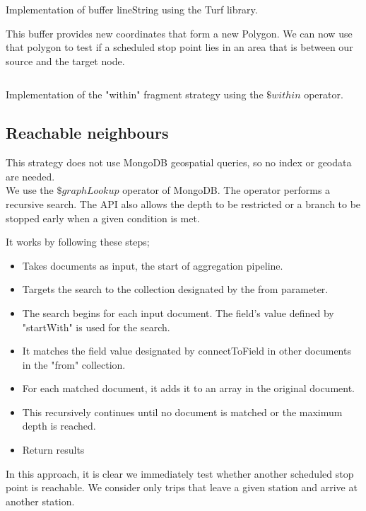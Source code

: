 \begin{listing}[H]
    \inputminted[linenos,frame=single,breaklines]{TypeScript}{code/turf.ts}
    \caption{Implementation of buffer lineString using the Turf library.}
\end{listing}

This buffer provides new coordinates that form a new Polygon. We can now use that polygon to test if a scheduled stop point lies in an area that is between our source and the target node.

\begin{listing}[H]
    \inputminted[linenos,frame=single,breaklines]{TypeScript}{code/within.ts}
    \caption{Implementation of the "within" fragment strategy using the $\$within$ operator.}
\end{listing}

\subsection{Reachable neighbours}
This strategy does not use MongoDB geospatial queries, so no index or geodata are needed. \\We use the $\$graphLookup$ \cite{noauthor_graphlookup_nodate} operator of MongoDB. The operator performs a recursive search. The API also allows the depth to be restricted or a branch to be stopped early when a given condition is met. 

It works by following these steps;
\begin{itemize}
    \item Takes documents as input, the start of aggregation pipeline.
    \item Targets the search to the collection designated by the from parameter.
    \item The search begins for each input document. The field's value defined by "startWith" is used for the search.
    \item It matches the field value designated by connectToField in other documents in the "from" collection.
    \item For each matched document, it adds it to an array in the original document. 
    \item This recursively continues until no document is matched or the maximum depth is reached.
    \item Return results
\end{itemize}

In this approach, it is clear we immediately test whether another scheduled stop point is reachable. We consider only trips that leave a given station and arrive at another station.


